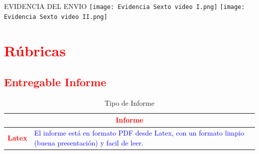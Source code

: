 \documentclass{article}
\begin{document}
        \item EVIDENCIA DEL ENVIO
        \newline \newline\newline\newline 
        \texttt{[image: Evidencia Sexto video I.png]}
        \newline 
        \texttt{[image: Evidencia Sexto video II.png]}

    \clearpage

	\section{\textcolor{red}{Rúbricas}}
	
	\subsection{\textcolor{red}{Entregable Informe}}
	\begin{table}[H]
		\caption{Tipo de Informe}
		\setlength{\tabcolsep}{0.5em} %
		{\renewcommand{\arraystretch}{1.5}%
		\begin{tabular}{|p{3cm}|p{12cm}|}
			\hline
			\multicolumn{2}{|c|}{\textbf{\textcolor{red}{Informe}}}  \\
			\hline 
			\textbf{\textcolor{red}{Latex}} & \textcolor{blue}{El informe está en formato PDF desde Latex,  con un formato limpio (buena presentación) y facil de leer.}   \\ 
			\hline 
			
			
		\end{tabular}
	}
	\end{table}
	

	
\end{document}
